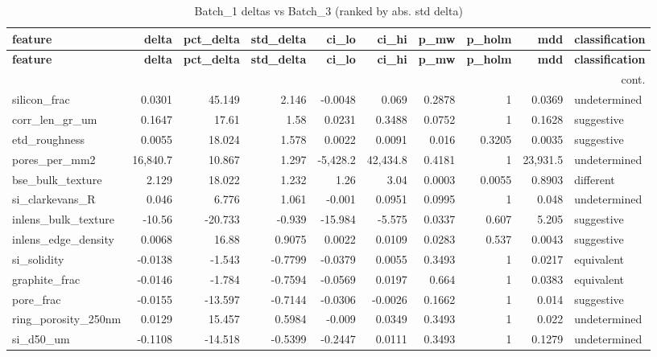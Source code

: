 \documentclass[11pt,a4paper]{article}
\begin{document}
\scriptsize
\begin{longtable}{lrrrrrrrrl}
\caption{Batch\_1 deltas vs Batch\_3 (ranked by abs. std delta)}\label{tab:deltaBatch_1}\\
\toprule
\textbf{feature} & \textbf{delta} & \textbf{pct\_delta} & \textbf{std\_delta} & \textbf{ci\_lo} & \textbf{ci\_hi} & \textbf{p\_mw} & \textbf{p\_holm} & \textbf{mdd} & \textbf{classification} \\
\midrule
\endfirsthead
\toprule \textbf{feature} & \textbf{delta} & \textbf{pct\_delta} & \textbf{std\_delta} & \textbf{ci\_lo} & \textbf{ci\_hi} & \textbf{p\_mw} & \textbf{p\_holm} & \textbf{mdd} & \textbf{classification} \\
\midrule
\endhead
\midrule\multicolumn{10}{r}{\footnotesize cont.}\\\midrule\endfoot
\bottomrule\endlastfoot
silicon\_frac & 0.0301 & 45.149 & 2.146 & -0.0048 & 0.069 & 0.2878 & 1 & 0.0369 & undetermined \\
corr\_len\_gr\_um & 0.1647 & 17.61 & 1.58 & 0.0231 & 0.3488 & 0.0752 & 1 & 0.1628 & suggestive \\
etd\_roughness & 0.0055 & 18.024 & 1.578 & 0.0022 & 0.0091 & 0.016 & 0.3205 & 0.0035 & suggestive \\
pores\_per\_mm2 & 16,840.7 & 10.867 & 1.297 & -5,428.2 & 42,434.8 & 0.4181 & 1 & 23,931.5 & undetermined \\
bse\_bulk\_texture & 2.129 & 18.022 & 1.232 & 1.26 & 3.04 & 0.0003 & 0.0055 & 0.8903 & different \\
si\_clarkevans\_R & 0.046 & 6.776 & 1.061 & -0.001 & 0.0951 & 0.0995 & 1 & 0.048 & undetermined \\
inlens\_bulk\_texture & -10.56 & -20.733 & -0.939 & -15.984 & -5.575 & 0.0337 & 0.607 & 5.205 & suggestive \\
inlens\_edge\_density & 0.0068 & 16.88 & 0.9075 & 0.0022 & 0.0109 & 0.0283 & 0.537 & 0.0043 & suggestive \\
si\_solidity & -0.0138 & -1.543 & -0.7799 & -0.0379 & 0.0055 & 0.3493 & 1 & 0.0217 & equivalent \\
graphite\_frac & -0.0146 & -1.784 & -0.7594 & -0.0569 & 0.0197 & 0.664 & 1 & 0.0383 & equivalent \\
pore\_frac & -0.0155 & -13.597 & -0.7144 & -0.0306 & -0.0026 & 0.1662 & 1 & 0.014 & suggestive \\
ring\_porosity\_250nm & 0.0129 & 15.457 & 0.5984 & -0.009 & 0.0349 & 0.3493 & 1 & 0.022 & undetermined \\
si\_d50\_um & -0.1108 & -14.518 & -0.5399 & -0.2447 & 0.0111 & 0.3493 & 1 & 0.1279 & undetermined \\

\end{longtable}
\end{document}
